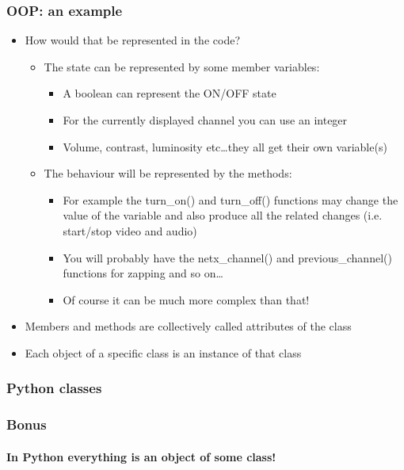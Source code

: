 \documentclass[9pt]{beamer}
\begin{document}
\begin{frame}
  \frametitle{OOP: an example}
 
  \begin{itemize}
    \item How would that be represented in the code?
    \smallskip
      \begin{itemize}
      \item The state can be represented by some member variables:
      \begin{itemize}
        \item A boolean can represent the ON/OFF state
        \item For the currently displayed channel you can use an integer
        \item Volume, contrast, luminosity etc\dots they all get their own variable(s)
      \end{itemize}

      \medskip
    
      \item The behaviour will be represented by the methods:
      \smallskip
      \begin{itemize}
        \item For example the turn\_on() and turn\_off() functions may change the value of the variable
              and also produce all the related changes (i.e. start/stop video and audio) 
        \item You will probably have the netx\_channel() and previous\_channel() functions for zapping and so on\dots
        \item Of course it can be much more complex than that!
      \end{itemize}
    \end{itemize}
    
    \medskip
    
    \item Members and methods are collectively called \alert{attributes} of the class
    \medskip
    \item Each object of a specific class is an \alert{instance} of that class
  \end{itemize}

\end{frame}


\begin{frame}
  \frametitle{Python classes}
  
\end{frame}


\begin{frame}
  \frametitle{Bonus}
  \framesubtitle{In Python everything is an object of some class!}
  
\end{frame}
\end{document}
